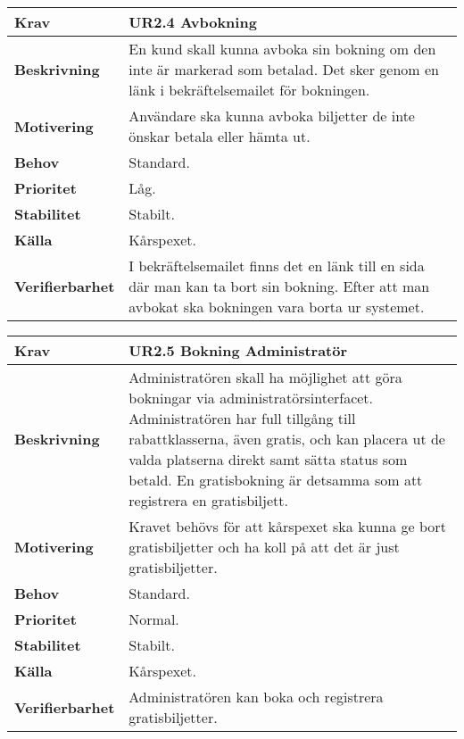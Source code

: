 \documentclass[a4paper, twoside, 11pt, titlepage]{article}
\begin{document}
		\begin {table} [ht] \begin{tabular} { p{2.6cm} p{12.5cm} }
			\hline
			{\sffamily\textbf{Krav}} & {\sffamily\textbf{UR2.4 Avbokning }} \\
			\hline
			{\sffamily\textbf{Beskrivning}} & {En kund skall kunna avboka sin bokning om den inte är markerad som betalad. Det sker genom en länk i bekräftelsemailet för bokningen.} \\
			\hline
			{\sffamily\textbf{Motivering}} & {Användare ska kunna avboka biljetter de inte önskar betala eller hämta ut.} \\
			\hline
			{\sffamily\textbf{Behov}} & {Standard.} \\
			\hline
			{\sffamily\textbf{Prioritet}} & {Låg.} \\
			\hline
			{\sffamily\textbf{Stabilitet}} & {Stabilt.} \\
			\hline
			{\sffamily\textbf{Källa}} & {Kårspexet.} \\
			\hline
			{\sffamily\textbf{Verifierbarhet}} & {I bekräftelsemailet finns det en länk till en sida där man kan ta bort sin bokning. Efter att man avbokat ska bokningen vara borta ur systemet.} \\
			\hline
		\end{tabular} \end{table} \FloatBarrier
		\vspace{6mm}

		\begin {table} [ht] \begin{tabular} { p{2.6cm} p{12.5cm} }
			\hline
			{\sffamily\textbf{Krav}} & {\sffamily\textbf{UR2.5 Bokning Administratör }} \\
			\hline
			{\sffamily\textbf{Beskrivning}} & {Administratören skall ha möjlighet att göra bokningar via administratörsinterfacet. Administratören har full tillgång till rabattklasserna, även gratis, och kan placera ut de valda platserna direkt samt sätta status som betald. En gratisbokning är detsamma som att registrera en gratisbiljett.} \\
			\hline
			{\sffamily\textbf{Motivering}} & {Kravet behövs för att kårspexet ska kunna ge bort gratisbiljetter och ha koll på att det är just gratisbiljetter.} \\
			\hline
			{\sffamily\textbf{Behov}} & {Standard.} \\
			\hline
			{\sffamily\textbf{Prioritet}} & {Normal.} \\
			\hline
			{\sffamily\textbf{Stabilitet}} & {Stabilt.} \\
			\hline
			{\sffamily\textbf{Källa}} & {Kårspexet.} \\
			\hline
			{\sffamily\textbf{Verifierbarhet}} & {Administratören kan boka och registrera gratisbiljetter.} \\
			\hline
		\end{tabular} \end{table} \FloatBarrier
		\vspace{6mm}
\end{document}
